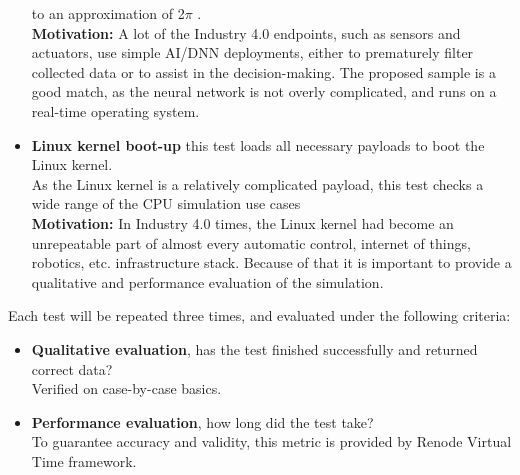 \begin{itemize}
{    to an approximation of 2$\pi$ \cite{ZephyrTF}.\\
    \textbf{Motivation:} A lot of the Industry 4.0 endpoints, such as sensors and actuators, use simple AI/DNN
    deployments, either to prematurely filter collected data or to assist in the decision-making. The proposed sample
    is a good match, as the neural network is not overly complicated, and runs on a real-time operating system.}
    \item{\textbf{Linux kernel boot-up} this test loads all necessary payloads to boot the Linux kernel.\\
    As the Linux kernel is a relatively complicated payload, this test checks a wide range of the CPU simulation use
    cases\\
    \textbf{Motivation:} In Industry 4.0 times, the Linux kernel had become an unrepeatable part of almost every
    automatic control, internet of things, robotics, etc. infrastructure stack. Because of that it is important to
    provide a qualitative and performance evaluation of the simulation.}
\end{itemize}

\noindent
Each test will be repeated three times, and evaluated under the following criteria:
\begin{itemize}
    \item{\textbf{Qualitative evaluation}, has the test finished successfully and returned correct data?\\
    Verified on case-by-case basics.}
    \item{\textbf{Performance evaluation}, how long did the test take?\\To guarantee accuracy and validity, this metric is
     provided by Renode Virtual Time framework.}
\end{itemize}


